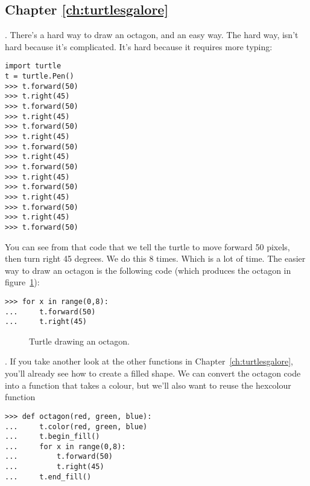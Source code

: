\subsection*{Chapter \ref{ch:turtlesgalore}}

. There's a hard way to draw an octagon, and an easy way.  The hard way, isn't hard because it's complicated.  It's hard because it requires more typing:

\begin{listing}
\begin{verbatim}
import turtle
t = turtle.Pen()
>>> t.forward(50)
>>> t.right(45)
>>> t.forward(50)
>>> t.right(45)
>>> t.forward(50)
>>> t.right(45)
>>> t.forward(50)
>>> t.right(45)
>>> t.forward(50)
>>> t.right(45)
>>> t.forward(50)
>>> t.right(45)
>>> t.forward(50)
>>> t.right(45)
>>> t.forward(50)
\end{verbatim}
\end{listing}

\noindent
You can see from that code that we tell the turtle to move forward 50 pixels, then turn right 45 degrees.  We do this 8 times.  Which is a lot of time.  The easier way to draw an octagon is the following code (which produces the octagon in figure~\ref{fig48}):

\begin{listing}
\begin{verbatim}
>>> for x in range(0,8):
...     t.forward(50)
...     t.right(45)
\end{verbatim}
\end{listing}

\begin{figure}
\begin{center}
\end{center}
\caption{Turtle drawing an octagon.}\label{fig48}
\end{figure}

.  If you take another look at the other functions in Chapter~\ref{ch:turtlesgalore}, you'll already see how to create a filled shape. We can convert the octagon code into a function that takes a colour, but we'll also want to reuse the hexcolour function 

\begin{listing}
\begin{verbatim}
>>> def octagon(red, green, blue):
...     t.color(red, green, blue)
...     t.begin_fill()
...     for x in range(0,8):
...         t.forward(50)
...         t.right(45)
...     t.end_fill()
\end{verbatim}
\end{listing}

